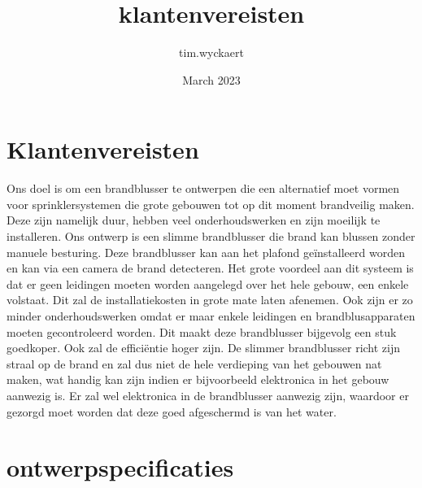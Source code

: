 \documentclass{article}
\title{klantenvereisten}
\author{tim.wyckaert }
\date{March 2023}
\begin{document}
\maketitle

\section{Klantenvereisten}

Ons doel is om een brandblusser te ontwerpen die een alternatief moet vormen voor sprinklersystemen die grote gebouwen tot op dit moment brandveilig maken. Deze zijn namelijk duur, hebben veel onderhoudswerken en zijn moeilijk te installeren. Ons ontwerp is een slimme brandblusser die brand kan blussen zonder manuele besturing. Deze brandblusser kan aan het plafond geïnstalleerd worden en kan via een camera  de brand  detecteren. Het grote voordeel aan dit systeem  is dat er geen leidingen moeten worden aangelegd over het hele gebouw, een enkele volstaat. Dit zal de installatiekosten in grote mate laten afenemen. Ook zijn er zo minder onderhoudswerken omdat er maar  enkele leidingen en brandblusapparaten moeten gecontroleerd worden. Dit maakt deze brandblusser bijgevolg een stuk goedkoper. Ook zal de efficiëntie hoger zijn. De slimmer brandblusser richt zijn straal op de brand en zal dus niet de hele verdieping van het gebouwen nat maken, wat handig kan zijn indien er  bijvoorbeeld elektronica in het gebouw aanwezig is. Er zal wel elektronica in de brandblusser aanwezig zijn, waardoor er gezorgd moet worden dat deze goed afgeschermd is van het water.


\section{ontwerpspecificaties}
\end{document}
